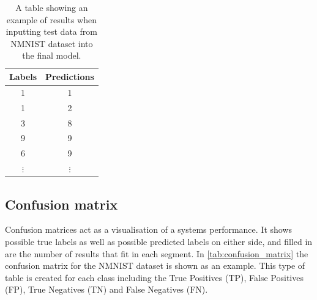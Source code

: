 \begin{table}[htb]
    \centering
    \begin{tabular}{|| c  | c ||}
        \hline
        Labels     & Predictions \\
        \hline \hline
        1          & 1           \\
        \hline
        1          & 2           \\
        \hline
        3          & 8           \\
        \hline
        9          & 9           \\
        \hline
        6          & 9           \\
        \hline
        $ \vdots $ & $ \vdots $  \\
    \end{tabular}
    \caption{A table showing an example of results when inputting test data from NMNIST dataset\cite{NMNIST} into the final model.}
    \label{tab:possible_results}
\end{table}

\subsection{Confusion matrix}

Confusion matrices act as a visualisation of a systems performance. It shows possible true labels as well as possible predicted labels on either side, and filled in are the number of results that fit in each segment. In \cref{tab:confusion_matrix} the confusion matrix for the NMNIST dataset is shown as an example. This type of table is created for each class including the True Positives (TP), False Positives (FP), True Negatives (TN) and False Negatives (FN).

